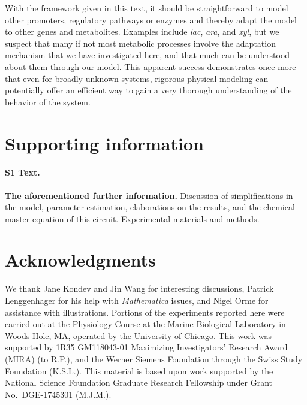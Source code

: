 \documentclass[10pt,letterpaper]{article}
\begin{document}
	With the framework given in this text, it
	should be straightforward to model other promoters, regulatory pathways or
	enzymes and thereby adapt the model to other genes and metabolites. Examples
	include \emph{lac}, \emph{ara}, and \emph{xyl}, but we suspect that many if
	not most metabolic processes involve the adaptation mechanism that we have
	investigated here, and that much can be understood about them through our
	model. This apparent success demonstrates once more that even for broadly
	unknown systems, rigorous physical modeling can potentially offer an
	efficient way to gain a very thorough understanding of the behavior of the
	system. 
	
	
	\section*{Supporting information}
	\paragraph*{S1 Text.}
	\label{S1_Text}
	{\bf The aforementioned further information.} Discussion of simplifications
	in the model, parameter estimation, elaborations on the results, and the
	chemical master equation of this circuit. Experimental materials and methods.
	
	\section*{Acknowledgments}
	We thank Jane Kondev and Jin Wang for interesting discussions, Patrick Lenggenhager for his help with \emph{Mathematica} issues, and Nigel Orme for assistance with illustrations.
	Portions of the experiments reported here were carried out at the
	Physiology Course at the Marine Biological Laboratory in Woods
	Hole, MA, operated by the University of Chicago.
	This work was supported by 1R35 GM118043-01 Maximizing Investigators'
	Research Award (MIRA) (to R.P.), and the Werner Siemens Foundation
	through the Swiss Study Foundation (K.S.L.). This material is based upon
	work supported by the National Science Foundation Graduate Research
	Fellowship under Grant No.\ DGE-1745301 (M.J.M.).
	
	\nolinenumbers
	
	
\end{document}
